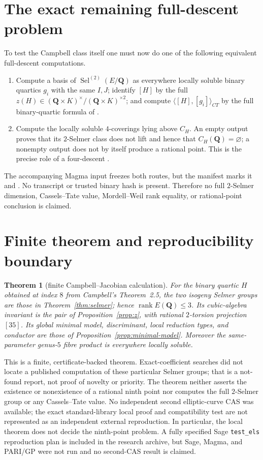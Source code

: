\documentclass[11pt]{article}
\newtheorem{theorem}{Theorem}
\newcommand{\Q}{\mathbf Q}
\newcommand{\Sel}{\operatorname{Sel}}
\begin{document}
\section{The exact remaining full-descent problem}
To test the Campbell class itself one must now do one of the following
equivalent full-descent computations.
\begin{enumerate}
\item Compute a basis of $\Sel^{(2)}(E/\Q)$ as everywhere locally soluble
binary quartics $g_i$ with the same $I,J$; identify $[H]$ by the full
$z(H)\in(\Q\times K)^\times/(\Q\times K)^{\times2}$; and compute
$\langle[H],[g_i]\rangle_{CT}$ by the full binary-quartic formula of
\cite[Theorem~3.1]{Fisher2022}.
\item Compute the locally soluble $4$-coverings lying above $C_H$.  An empty
output proves that its $2$-Selmer class does not lift and hence that
$C_H(\Q)=\varnothing$; a nonempty output does not by itself produce a
rational point.  This is the precise role of a four-descent
\cite[Section ``Four-Descent'']{MagmaHandbook}.
\end{enumerate}
The accompanying Magma input freezes both routes, but the manifest marks it
 and
.  No transcript or trusted
binary hash is present.  Therefore no full $2$-Selmer dimension,
Cassels--Tate value, Mordell--Weil rank equality, or rational-point conclusion
is claimed.

\section{Finite theorem and reproducibility boundary}
\begin{theorem}[finite Campbell--Jacobian calculation]
For the binary quartic $H$ obtained at index $8$ from Campbell's
Theorem~2.5, the two isogeny Selmer groups are those in
Theorem~\ref{thm:selmer}; hence $\operatorname{rank}E(\Q)\le3$.  Its
cubic-algebra invariant is the pair of Proposition~\ref{prop:z}, with
rational $2$-torsion projection $[35]$.  Its global minimal model,
discriminant, local reduction types, and conductor are those of
Proposition~\ref{prop:minimal-model}.  Moreover the same-parameter
genus-$5$ fibre product is everywhere locally soluble.
\end{theorem}
This is a finite, certificate-backed theorem.  Exact-coefficient searches did
not locate a published computation of these particular Selmer groups; that is
a not-found report, not proof of novelty or priority.  The theorem neither
asserts the existence or nonexistence of a rational ninth point nor computes
the full $2$-Selmer group or any Cassels--Tate value.  No independent second
elliptic-curve CAS was available; the exact standard-library local proof and
compatibility test are not represented as an independent external
reproduction.  In particular, the local theorem does not decide the
ninth-point problem. A fully specified Sage \texttt{test\_els} reproduction
plan is included in the research archive, but Sage, Magma, and PARI/GP were
not run and no second-CAS result is claimed.
\end{document}
